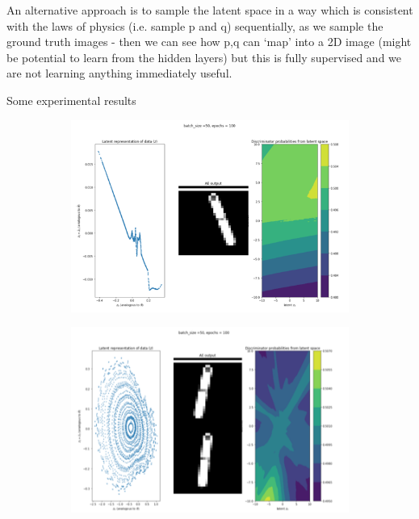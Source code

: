 \documentclass{article}
\begin{document}
An alternative approach is to sample the latent space in a way which is consistent with the laws of physics (i.e. sample p and q) sequentially, as we sample the ground truth images - then we can see how p,q can ‘map’ into a 2D image (might be potential to learn from the hidden layers) but this is fully supervised and we are not learning anything immediately useful.

Some experimental results
\begin{figure}[h!]
\centering
\begin{subfigure}{0.7\textwidth}
\includegraphics[width=\textwidth]{figures/gan_phase_1stack.png}
\end{subfigure}
\begin{subfigure}{0.7\textwidth}
\includegraphics[width=\textwidth]{figures/gan_phase_2stack.png}
\end{subfigure}
\begin{subfigure}{0.7\textwidth}

\end{subfigure}
\end{figure}
\end{document}
